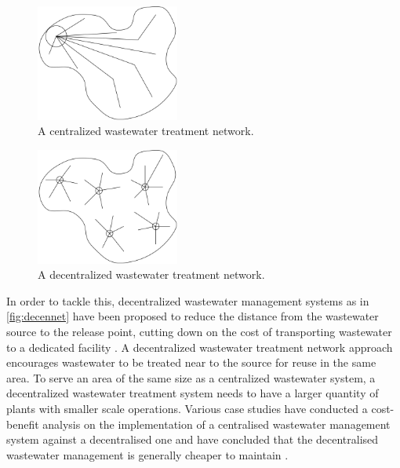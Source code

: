 \documentclass[preprint,12pt,authoryear]{elsarticle}
\begin{document}
\begin{figure}%
	\begin{center}
		\includegraphics[width=0.42\textwidth]{centralizedtreatment.png}
	\end{center}
		\caption{A centralized wastewater treatment network.}
		\label{fig:cennet}
\end{figure}%
\begin{figure}%
	\begin{center}
		\includegraphics[width=0.42\textwidth]{decentralizedtreatment.png}
	\end{center}
		\caption{A decentralized wastewater treatment network.}
		\label{fig:decennet}
\end{figure}

In order to tackle this, decentralized wastewater management systems as in \autoref{fig:decennet} have been proposed to reduce the distance from the wastewater source to the release point, cutting down on the cost of transporting wastewater to a dedicated facility \citep{otterpohl1997,wilderer2000,bakir2001}. A decentralized wastewater treatment network approach encourages wastewater to be treated near to the source for reuse in the same area. To serve an area of the same size as a centralized wastewater system, a decentralized wastewater treatment system needs to have a larger quantity of plants with smaller scale operations. Various case studies have conducted a cost-benefit analysis on the implementation of a centralised wastewater management system against a decentralised one and have concluded that the decentralised wastewater management is generally cheaper to maintain \citep{prihandrijanti2008,mawss2015}. 
\end{document}
